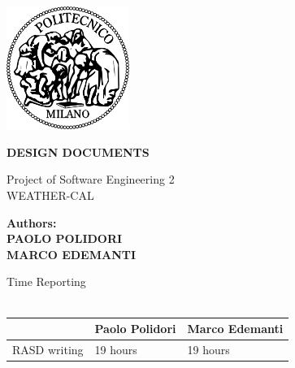 \documentclass[a4paper,12pt]{book}
\begin{document}
 \begin{center}
    \includegraphics[width=4cm]{../RASD/immagini/polilogo.png}
    \end{center}
\begin{center}

{\huge{\bf\uppercase {Design Documents}}}


\end{center}
\vspace*{0.5cm}
\begin{center}
{\large Project of Software Engineering 2\\ \vspace*{0.5cm} \huge WEATHER-CAL}
\end{center}
\begin{flushright}
 \vspace*{9cm}

        {\bf Authors: }\\
        \vspace*{0.2cm}
            {\bf   {PAOLO POLIDORI} }\\
             \vspace*{0.3cm}
            {\bf   {MARCO EDEMANTI} }
    \end{flushright}

\doublespacing    
\tableofcontents






{\huge Time Reporting}\\ \\
\begin{tabularx}{\linewidth}{|r|X|X|}
  \hline  & {\bf Paolo Polidori} & {\bf Marco Edemanti}\\
  \hline RASD writing & 19 hours & 19 hours\\
  \hline
\end{tabularx}\\
\listoffigures
\lstlistoflistings
\end{document}
